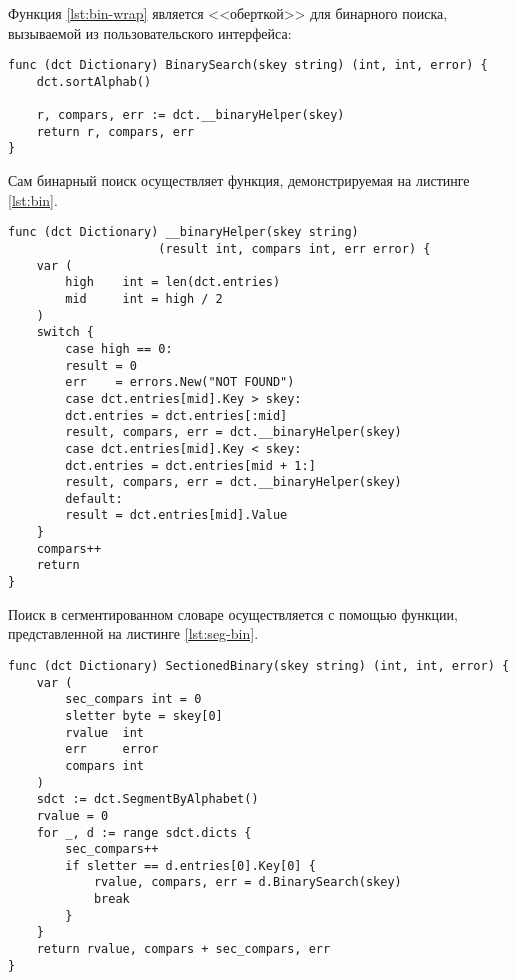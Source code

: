 Функция \ref{lst:bin-wrap} является <<оберткой>> для бинарного поиска, вызываемой из пользовательского интерфейса:

\begin{lstlisting}[label=lst:bin-wrap,caption=Бинарный поиск(функция - обертка)]
func (dct Dictionary) BinarySearch(skey string) (int, int, error) {
	dct.sortAlphab()
	
	r, compars, err := dct.__binaryHelper(skey)
	return r, compars, err
}
\end{lstlisting}

Сам бинарный поиск осуществляет функция, демонстрируемая на листинге \ref{lst:bin}. \\

\begin{lstlisting}[label=lst:bin,caption=Бинарный поиск]
func (dct Dictionary) __binaryHelper(skey string) 
					 (result int, compars int, err error) {
	var (
		high    int = len(dct.entries)
		mid     int = high / 2
	)
	switch {
		case high == 0:
		result = 0
		err    = errors.New("NOT FOUND")
		case dct.entries[mid].Key > skey:
		dct.entries = dct.entries[:mid]
		result, compars, err = dct.__binaryHelper(skey)
		case dct.entries[mid].Key < skey:
		dct.entries = dct.entries[mid + 1:]
		result, compars, err = dct.__binaryHelper(skey)
		default:
		result = dct.entries[mid].Value
	}
	compars++
	return
}
\end{lstlisting}

Поиск в сегментированном словаре осуществляется с помощью функции, представленной на листинге \ref{lst:seg-bin}.

\begin{lstlisting}[label=lst:seg-bin,caption=Бинарный поиск в сегментированном словаре]
func (dct Dictionary) SectionedBinary(skey string) (int, int, error) {
	var (
		sec_compars int = 0
		sletter byte = skey[0]
		rvalue  int
		err     error
		compars int
	)
	sdct := dct.SegmentByAlphabet()
	rvalue = 0
	for _, d := range sdct.dicts {
		sec_compars++
		if sletter == d.entries[0].Key[0] {
			rvalue, compars, err = d.BinarySearch(skey)
			break
		}
	}	
	return rvalue, compars + sec_compars, err
}
\end{lstlisting}

